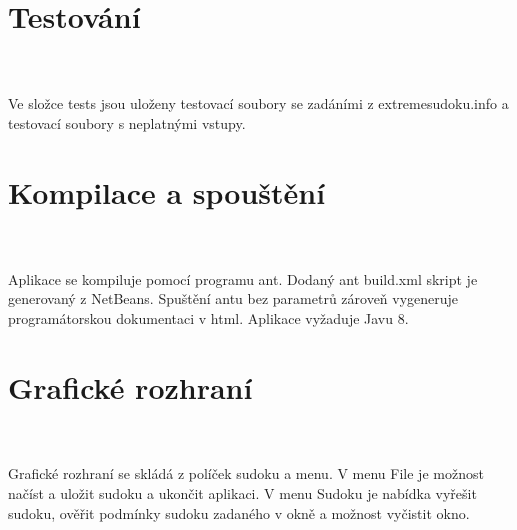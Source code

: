 \documentclass[10pt]{article}
\begin{document}
\section{Testov\'an\'i}
\paragraph{~}Ve slo\v{z}ce tests jsou ulo\v{z}eny testovac\'i soubory se zad\'an\'imi z extremesudoku.info a testovac\'i soubory s neplatn\'ymi vstupy.
\section{Kompilace a spou\v{s}t\v{e}n\'i}
\paragraph{~}Aplikace se kompiluje pomoc\'i programu ant. Dodan\'y ant build.xml skript je generovan\'y z NetBeans. Spu\v{s}t\v{e}n\'i antu bez parametr\r{u} z\'arove\v{n} vygeneruje program\'atorskou dokumentaci v html. Aplikace vy\v{z}aduje Javu 8.
\section{Grafick\'e rozhran\'i}
\paragraph{~}Grafick\'e rozhran\'i se skl\'ad\'a z pol\'i\v{c}ek sudoku a menu. V menu File je mo\v{z}nost na\v{c}\'ist a ulo\v{z}it sudoku a ukon\v{c}it aplikaci. V menu Sudoku je nab\'idka vy\v{r}e\v{s}it sudoku, ov\v{e}\v{r}it podm\'inky sudoku zadan\'eho v okn\v{e} a mo\v{z}nost vy\v{c}istit okno.
\end{document}
